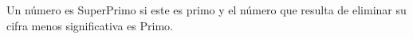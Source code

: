 Un número es SuperPrimo si este es primo y el número que resulta de eliminar su cifra menos significativa es Primo.


